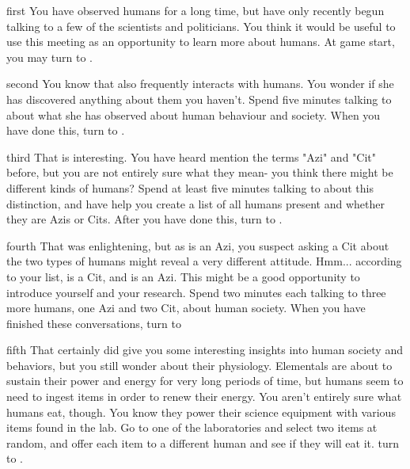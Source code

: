 \documentclass[notebook]{elementals} %
\begin{document}
\startnotebook{\nLearnAboutHumans{}}

\begin{page}{first}
You have observed humans for a long time, but have only recently begun talking to a few of the scientists and politicians.  You think it would be useful to use this meeting as an opportunity to learn more about humans.  At game start, you may  turn to .
\end{page}

\begin{page}{second}
You know that \cJuliet{} also frequently interacts with humans.  You wonder if she has discovered anything about them you haven't.  Spend five minutes talking to \cJuliet{\them} about what she has observed about human behaviour and society.  When you have done this, turn to .
\end {page}

\begin{page}{third}
 That is interesting.  You have heard \cDiplomat{} mention the terms "Azi" and "Cit" before, but you are not entirely sure what they mean- you think there might be different kinds of humans?  Spend at least five minutes talking to \cDiplomat{} about this distinction, and have \cDiplomat{\them} help you create a list of all humans present and whether they are Azis or Cits.  After you have done this, turn to .
\end{page}

\begin{page}{fourth}
That was enlightening, but as \cDiplomat{} is an Azi, you suspect asking a Cit about the two types of humans might reveal a very different attitude.  Hmm... according to your list, \cGD{\intro} is a Cit, and \cScientist{\intro} is an Azi.  This might be a good opportunity to introduce yourself and your research.  Spend two minutes each talking to three more humans, one Azi and two Cit, about human society.  When you have finished these conversations, turn to 
\end{page}

\begin{page}{fifth}
 That certainly did give you some interesting insights into human society and behaviors, but you still wonder about their physiology.  Elementals are about to sustain their power and energy for very long periods of time, but humans seem to need to ingest items in order to renew their energy.  You aren't entirely sure what humans eat, though.  You know they power their science equipment with various items found in the lab.  Go to one of the laboratories and select two items at random, and offer each item to a different human and see if they will eat it.
 turn to .
\end{page}
\end{document}
